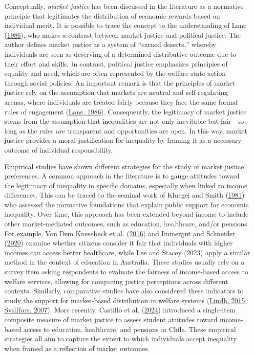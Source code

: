 \documentclass[
  12pt,
]{article}
\begin{document}
Conceptually, \emph{market justice} has been discussed in the literature
as a normative principle that legitimates the distribution of economic
rewards based on individual merit. It is possible to trace the concept
to the understanding of Lane
(\protect\hyperlink{ref-lane_market_1986}{1986}), who makes a contrast
between market justice and political justice. The author defines market
justice as a system of ``earned deserts,'' whereby individuals are seen
as deserving of a determined distributive outcome due to their effort
and skills. In contrast, political justice emphasizes principles of
equality and need, which are often represented by the welfare state
action through social policies. An important remark is that the
principles of market justice rely on the assumption that markets are
neutral and self-regulating arenas, where individuals are treated fairly
because they face the same formal rules of engagement
(\protect\hyperlink{ref-lane_market_1986}{Lane, 1986}). Consequently,
the legitimacy of market justice stems from the assumption that
inequalities are not only inevitable but fair---so long as the rules are
transparent and opportunities are open. In this way, market justice
provides a moral justification for inequality by framing it as a
necessary outcome of individual responsibility.

Empirical studies have shown different strategies for the study of
market justice preferences. A common approach in the literature is to
gauge attitudes toward the legitimacy of inequality in specific domains,
especially when linked to income differences. This can be traced to the
seminal work of Kluegel and Smith
(\protect\hyperlink{ref-kluegel_beliefs_1981}{1981}) who assessed the
normative foundations that explain public support for economic
inequality. Over time, this approach has been extended beyond income to
include other market-mediated outcomes, such as education, healthcare,
and/or pensions. For example, Von Dem Knesebeck et al.
(\protect\hyperlink{ref-vondemknesebeck_are_2016}{2016}) and Immergut
and Schneider (\protect\hyperlink{ref-immergut_it_2020}{2020}) examine
whether citizens consider it fair that individuals with higher incomes
can access better healthcare, while Lee and Stacey
(\protect\hyperlink{ref-lee_fairness_2023}{2023}) apply a similar method
in the context of education in Australia. These studies usually rely on
a survey item asking respondents to evaluate the fairness of
income-based access to welfare services, allowing for comparing justice
perceptions across different contexts. Similarly, comparative studies
have also considered these indicators to study the support for
market-based distribution in welfare systems
(\protect\hyperlink{ref-lindh_public_2015}{Lindh, 2015};
\protect\hyperlink{ref-svallfors_political_2007}{Svallfors, 2007}). More
recently, Castillo et al.
(\protect\hyperlink{ref-castillo_socialization_2024}{2024}) introduced a
single-item composite measure of market justice to assess student
attitudes toward income-based access to education, healthcare, and
pensions in Chile. These empirical strategies all aim to capture the
extent to which individuals accept inequality when framed as a
reflection of market outcomes.
\end{document}
